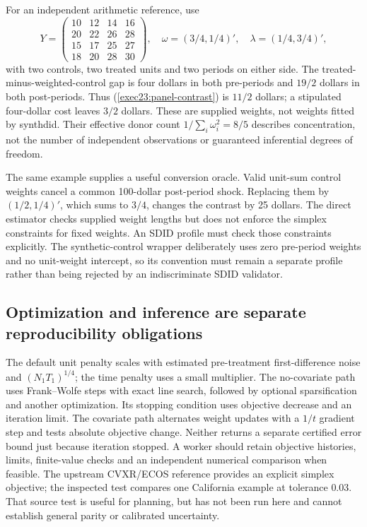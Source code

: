 For an independent arithmetic reference, use
\begin{equation}
 Y=\begin{pmatrix}
 10&12&14&16\\20&22&26&28\\15&17&25&27\\18&20&28&30
 \end{pmatrix},
 \quad\omega=(3/4,1/4)',\quad\lambda=(1/4,3/4)',
 \label{exec23:panel-block-example}
\end{equation}
with two controls, two treated units and two periods on either side. The
treated-minus-weighted-control gap is four dollars in both pre-periods and
$19/2$ dollars in both post-periods. Thus (\ref{exec23:panel-contrast}) is
$11/2$ dollars; a stipulated four-dollar cost leaves $3/2$ dollars. These are
supplied weights, not weights fitted by synthdid. Their effective donor count
$1/\sum_i\omega_i^2=8/5$ describes concentration, not the number of
independent observations or guaranteed inferential degrees of freedom.
\citep{exec23_synthdid_reference}

The same example supplies a useful conversion oracle. Valid unit-sum control
weights cancel a common 100-dollar post-period shock. Replacing them by
$(1/2,1/4)'$, which sums to $3/4$, changes the contrast by 25 dollars. The
direct estimator checks supplied weight lengths but does not enforce the
simplex constraints for fixed weights. An SDID profile must check those
constraints explicitly. The synthetic-control wrapper deliberately uses
zero pre-period weights and no unit-weight intercept, so its convention must
remain a separate profile rather than being rejected by an indiscriminate
SDID validator. \citep{exec23_synthdid_reuse_source,exec23_synthdid_reference}

\subsection{Optimization and inference are separate reproducibility obligations}
\label{exec23:panel-inference}
The default unit penalty scales with estimated pre-treatment first-difference
noise and $(N_1T_1)^{1/4}$; the time penalty uses a small multiplier. The
no-covariate path uses Frank--Wolfe steps with exact line search, followed by
optional sparsification and another optimization. Its stopping condition
uses objective decrease and an iteration limit. The covariate path alternates
weight updates with a $1/t$ gradient step and tests absolute objective change.
Neither returns a separate certified error bound just because iteration
stopped. A worker should retain objective histories, limits, finite-value
checks and an independent numerical comparison when feasible. The upstream
CVXR/ECOS reference provides an explicit simplex objective; the inspected
test compares one California example at tolerance $0.03$. That source test
is useful for planning, but has not been run here and cannot establish
general parity or calibrated uncertainty.
\citep{exec23_synthdid_reuse_source}


